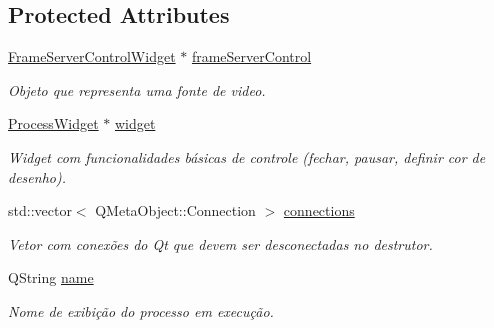 \subsection*{Protected Attributes}
\begin{DoxyCompactItemize}
\item 
\hypertarget{class_process_control_a92b9bba974596786a40980a15cbf57b0}{}\hyperlink{class_frame_server_control_widget}{Frame\+Server\+Control\+Widget} $\ast$ \hyperlink{class_process_control_a92b9bba974596786a40980a15cbf57b0}{frame\+Server\+Control}\label{class_process_control_a92b9bba974596786a40980a15cbf57b0}

\begin{DoxyCompactList}\small\item\em Objeto que representa uma fonte de video. \end{DoxyCompactList}\item 
\hypertarget{class_process_control_ae36e86e26d6a323a052c5e1b20c7deef}{}\hyperlink{class_process_widget}{Process\+Widget} $\ast$ \hyperlink{class_process_control_ae36e86e26d6a323a052c5e1b20c7deef}{widget}\label{class_process_control_ae36e86e26d6a323a052c5e1b20c7deef}

\begin{DoxyCompactList}\small\item\em Widget com funcionalidades básicas de controle (fechar, pausar, definir cor de desenho). \end{DoxyCompactList}\item 
\hypertarget{class_process_control_a8479dec0c2314e7a56e43aa7ef3bba27}{}std\+::vector$<$ Q\+Meta\+Object\+::\+Connection $>$ \hyperlink{class_process_control_a8479dec0c2314e7a56e43aa7ef3bba27}{connections}\label{class_process_control_a8479dec0c2314e7a56e43aa7ef3bba27}

\begin{DoxyCompactList}\small\item\em Vetor com conexões do Qt que devem ser desconectadas no destrutor. \end{DoxyCompactList}\item 
\hypertarget{class_process_control_abc29e461e01cc0c712944f8f47f91331}{}Q\+String \hyperlink{class_process_control_abc29e461e01cc0c712944f8f47f91331}{name}\label{class_process_control_abc29e461e01cc0c712944f8f47f91331}

\begin{DoxyCompactList}\small\item\em Nome de exibição do processo em execução. \end{DoxyCompactList}\end{DoxyCompactItemize}


